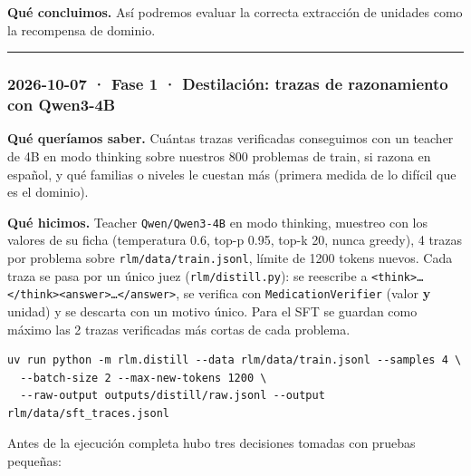 \textbf{Qué concluimos.} Así podremos evaluar la correcta extracción de unidades como la recompensa de dominio.

\begin{center}\rule{0.5\linewidth}{0.5pt}\end{center}

\subsubsection{2026-10-07 · Fase 1 · Destilación: trazas de razonamiento con Qwen3-4B}

\textbf{Qué queríamos saber.} Cuántas trazas verificadas conseguimos con un teacher de 4B en modo
thinking sobre nuestros 800 problemas de train, si razona en español, y qué familias o niveles
le cuestan más (primera medida de lo difícil que es el dominio).

\textbf{Qué hicimos.} Teacher \texttt{Qwen/\allowbreak{}Qwen3-4B} en modo thinking, muestreo con los valores de su ficha
(temperatura 0.6, top-p 0.95, top-k 20, nunca greedy), 4 trazas por problema sobre
\texttt{rlm/\allowbreak{}data/\allowbreak{}train.jsonl}, límite de 1200 tokens nuevos. Cada traza se pasa por un único juez
(\texttt{rlm/\allowbreak{}distill.py}): se reescribe a \texttt{\textless{}think\textgreater{}…\textless{}/\allowbreak{}think\textgreater{}\textless{}answer\textgreater{}…\textless{}/\allowbreak{}answer\textgreater{}}, se verifica con
\texttt{MedicationVerifier} (valor \textbf{y} unidad) y se descarta con un motivo único. Para el SFT se
guardan como máximo las 2 trazas verificadas más cortas de cada problema.

\begin{lstlisting}
uv run python -m rlm.distill --data rlm/data/train.jsonl --samples 4 \
  --batch-size 2 --max-new-tokens 1200 \
  --raw-output outputs/distill/raw.jsonl --output rlm/data/sft_traces.jsonl
\end{lstlisting}

Antes de la ejecución completa hubo tres decisiones tomadas con pruebas pequeñas:

